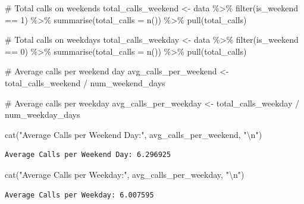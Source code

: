 \documentclass[
  letterpaper,
  DIV=11,
  numbers=noendperiod]{scrartcl}
\newenvironment{Shaded}{\begin{snugshade}}{\end{snugshade}}
\newcommand{\AttributeTok}[1]{\textcolor[rgb]{0.40,0.45,0.13}{#1}}
\newcommand{\CommentTok}[1]{\textcolor[rgb]{0.37,0.37,0.37}{#1}}
\newcommand{\DecValTok}[1]{\textcolor[rgb]{0.68,0.00,0.00}{#1}}
\newcommand{\FunctionTok}[1]{\textcolor[rgb]{0.28,0.35,0.67}{#1}}
\newcommand{\NormalTok}[1]{\textcolor[rgb]{0.00,0.23,0.31}{#1}}
\newcommand{\OtherTok}[1]{\textcolor[rgb]{0.00,0.23,0.31}{#1}}
\newcommand{\SpecialCharTok}[1]{\textcolor[rgb]{0.37,0.37,0.37}{#1}}
\newcommand{\StringTok}[1]{\textcolor[rgb]{0.13,0.47,0.30}{#1}}
\begin{document}
\begin{Shaded}
\begin{Highlighting}[]
\CommentTok{\# Total calls on weekends}
\NormalTok{total\_calls\_weekend }\OtherTok{\textless{}{-}}\NormalTok{ data }\SpecialCharTok{\%\textgreater{}\%}
  \FunctionTok{filter}\NormalTok{(is\_weekend }\SpecialCharTok{==} \DecValTok{1}\NormalTok{) }\SpecialCharTok{\%\textgreater{}\%}
  \FunctionTok{summarise}\NormalTok{(}\AttributeTok{total\_calls =} \FunctionTok{n}\NormalTok{()) }\SpecialCharTok{\%\textgreater{}\%}
  \FunctionTok{pull}\NormalTok{(total\_calls)}

\CommentTok{\# Total calls on weekdays}
\NormalTok{total\_calls\_weekday }\OtherTok{\textless{}{-}}\NormalTok{ data }\SpecialCharTok{\%\textgreater{}\%}
  \FunctionTok{filter}\NormalTok{(is\_weekend }\SpecialCharTok{==} \DecValTok{0}\NormalTok{) }\SpecialCharTok{\%\textgreater{}\%}
  \FunctionTok{summarise}\NormalTok{(}\AttributeTok{total\_calls =} \FunctionTok{n}\NormalTok{()) }\SpecialCharTok{\%\textgreater{}\%}
  \FunctionTok{pull}\NormalTok{(total\_calls)}

\CommentTok{\# Average calls per weekend day}
\NormalTok{avg\_calls\_per\_weekend }\OtherTok{\textless{}{-}}\NormalTok{ total\_calls\_weekend }\SpecialCharTok{/}\NormalTok{ num\_weekend\_days}

\CommentTok{\# Average calls per weekday}
\NormalTok{avg\_calls\_per\_weekday }\OtherTok{\textless{}{-}}\NormalTok{ total\_calls\_weekday }\SpecialCharTok{/}\NormalTok{ num\_weekday\_days}

\FunctionTok{cat}\NormalTok{(}\StringTok{"Average Calls per Weekend Day:"}\NormalTok{, avg\_calls\_per\_weekend, }\StringTok{"}\SpecialCharTok{\textbackslash{}n}\StringTok{"}\NormalTok{)}
\end{Highlighting}
\end{Shaded}

\begin{verbatim}
Average Calls per Weekend Day: 6.296925 
\end{verbatim}

\begin{Shaded}
\begin{Highlighting}[]
\FunctionTok{cat}\NormalTok{(}\StringTok{"Average Calls per Weekday:"}\NormalTok{, avg\_calls\_per\_weekday, }\StringTok{"}\SpecialCharTok{\textbackslash{}n}\StringTok{"}\NormalTok{)}
\end{Highlighting}
\end{Shaded}

\begin{verbatim}
Average Calls per Weekday: 6.007595 
\end{verbatim}
\end{document}
